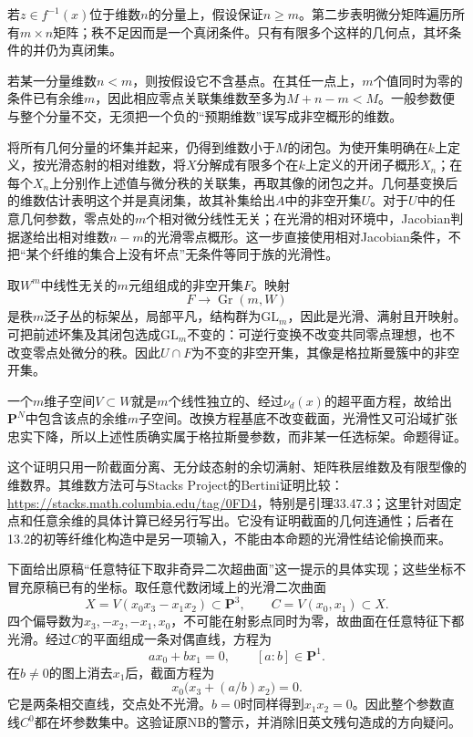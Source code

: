 \begin{analysisproof}
若$z\in f^{-1}(x)$位于维数$n$的分量上，假设保证$n\geq m$。第二步表明微分矩阵遍历所有$m\times n$矩阵；秩不足因而是一个真闭条件。只有有限多个这样的几何点，其坏条件的并仍为真闭集。

若某一分量维数$n<m$，则按假设它不含基点。在其任一点上，$m$个值同时为零的条件已有余维$m$，因此相应零点关联集维数至多为$M+n-m<M$。一般参数便与整个分量不交，无须把一个负的“预期维数”误写成非空概形的维数。

将所有几何分量的坏集并起来，仍得到维数小于$M$的闭包。为使开集明确在$k$上定义，按光滑态射的相对维数，将$X$分解成有限多个在$k$上定义的开闭子概形$X_n$；在每个$X_n$上分别作上述值与微分秩的关联集，再取其像的闭包之并。几何基变换后的维数估计表明这个并是真闭集，故其补集给出$A$中的非空开集$U$。对于$U$中的任意几何参数，零点处的$m$个相对微分线性无关；在光滑的相对环境中，Jacobian判据遂给出相对维数$n-m$的光滑零点概形。这一步直接使用相对Jacobian条件，不把“某个纤维的集合上没有坏点”无条件等同于族的光滑性。

取$W^m$中线性无关的$m$元组组成的非空开集$F$。映射
\[
F\longrightarrow\operatorname{Gr}(m,W)
\]
是秩$m$泛子丛的标架丛，局部平凡，结构群为$\mathrm{GL}_m$，因此是光滑、满射且开映射。可把前述坏集及其闭包选成$\mathrm{GL}_m$不变的：可逆行变换不改变共同零点理想，也不改变零点处微分的秩。因此$U\cap F$为不变的非空开集，其像是格拉斯曼簇中的非空开集。

一个$m$维子空间$V\subset W$就是$m$个线性独立的、经过$\nu_d(x)$的超平面方程，故给出$\mathbf P^N$中包含该点的余维$m$子空间。改换方程基底不改变截面，光滑性又可沿域扩张忠实下降，所以上述性质确实属于格拉斯曼参数，而非某一任选标架。命题得证。
\end{analysisproof}

这个证明只用一阶截面分离、无分歧态射的余切满射、矩阵秩层维数及有限型像的维数界。其维数方法可与Stacks Project的Bertini证明比较：\url{https://stacks.math.columbia.edu/tag/0FD4}，特别是引理33.47.3；这里针对固定点和任意余维的具体计算已经另行写出。它没有证明截面的几何连通性；后者在13.2的初等纤维化构造中是另一项输入，不能由本命题的光滑性结论偷换而来。

下面给出原稿“任意特征下取非奇异二次超曲面”这一提示的具体实现；这些坐标不冒充原稿已有的坐标。取任意代数闭域上的光滑二次曲面
\[
X=V(x_0x_3-x_1x_2)\subset\mathbf P^3,
\qquad C=V(x_0,x_1)\subset X.
\]
四个偏导数为$x_3,-x_2,-x_1,x_0$，不可能在射影点同时为零，故曲面在任意特征下都光滑。经过$C$的平面组成一条对偶直线，方程为
\[
a x_0+b x_1=0,
\qquad [a:b]\in\mathbf P^1.
\]
在$b\ne0$的图上消去$x_1$后，截面方程为
\[
x_0\bigl(x_3+(a/b)x_2\bigr)=0.
\]
它是两条相交直线，交点处不光滑。$b=0$时同样得到$x_1x_2=0$。因此整个参数直线$C^0$都在坏参数集中。这验证原NB的警示，并消除旧英文残句造成的方向疑问。

